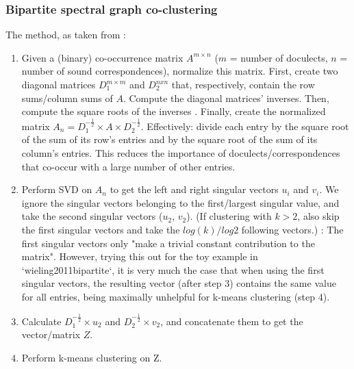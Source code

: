 \documentclass{article}
\begin{document}
\subsubsection{Bipartite spectral graph co-clustering}

The method, as taken from \citet{dhillon2001co-clustering}:

\begin{enumerate}
\item 
Given a (binary) co-occurrence matrix $A^{m \times n}$ ($m$ = number of doculects, $n$ = number of sound correspondences), normalize this matrix.
First, create two diagonal matrices $D_1^{m \times m}$ and $D_2^{n x n}$ that, respectively, contain the row sums/column sums of $A$.
Compute the diagonal matrices' inverses. 
Then, compute the square roots of the inverses
.
Finally, create the normalized matrix $A_n = D_1^{-\frac{1}{2}} \times A \times D_2^{-\frac{1}{2}}$.
Effectively: divide each entry by the square root of the sum of its row's entries and by the square root of the sum of its column's entries.
This reduces the importance of doculects/correspondences that co-occur with a large number of other entries.

\item
Perform SVD on $A_n$ to get the left and right singular vectors $u_i$ and $v_i$.
We ignore the singular vectors belonging to the first/largest singular value, and take the second singular vectors ($u_2$, $v_2$).
(If clustering with $k > 2$, also skip the first singular vectors and take the $log(k)/log2$ following vectors.)
\citet{kluger2003spectral}: The first singular vectors only "make a trivial constant contribution to the matrix".
However, trying this out for the toy example in `wieling2011bipartite`, it is very much the case that when using the first singular vectors, the resulting vector (after step 3) contains the same value for all entries, being maximally unhelpful for k-means clustering (step 4).

\item
Calculate $D_1^{-\frac{1}{2}} \times u_2$ and $D_2^{-\frac{1}{2}} \times v_2$, and concatenate them to get the vector/matrix $Z$. 

\item
Perform k-means clustering on Z.

\end{enumerate}
\end{document}
